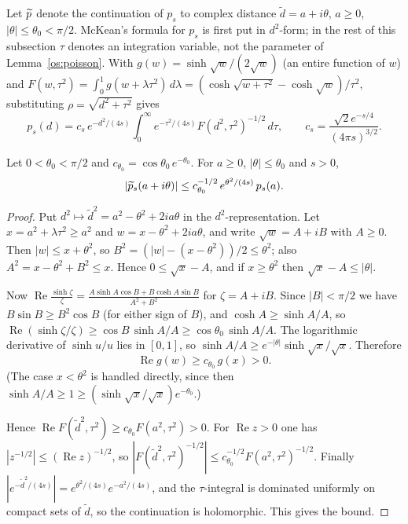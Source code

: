 Let $\widetilde p$ denote the continuation of $p_s$ to complex distance $\tilde d=a+i\theta$, $a\ge0$, $|\theta|\le\theta_0<\pi/2$.
McKean's formula for $p_s$ is first put in $d^2$-form; in the rest of this subsection $\tau$ denotes an integration variable, not the
parameter of Lemma~\ref{os:poisson}. With $g(w)=\sinh\sqrt w/(2\sqrt w)$ (an entire function of $w$) and
$F(w,\tau^2)=\int_0^1g(w+\lambda\tau^2)\,d\lambda=(\cosh\sqrt{w+\tau^2}-\cosh\sqrt w)/\tau^2$, substituting $\rho=\sqrt{d^2+\tau^2}$ gives
\[
p_s(d)=c_s\,e^{-d^2/(4s)}\int_0^\infty e^{-\tau^2/(4s)}F(d^2,\tau^2)^{-1/2}\,d\tau,\qquad c_s=\frac{\sqrt2e^{-s/4}}{(4\pi s)^{3/2}}.
\]

\begin{lemma}\label{os:hk}
Let $0<\theta_0<\pi/2$ and $c_{\theta_0}=\cos\theta_0\,e^{-\theta_0}$. For $a\ge0$, $|\theta|\le\theta_0$ and $s>0$,
\[
|\widetilde p_s(a+i\theta)|\le c_{\theta_0}^{-1/2}\,e^{\theta^2/(4s)}\,p_s(a).
\]
\end{lemma}
\begin{proof}
Put $d^2\mapsto\tilde d^2=a^2-\theta^2+2ia\theta$ in the $d^2$-representation. Let $x=a^2+\lambda\tau^2\ge a^2$ and $w=x-\theta^2+2ia\theta$,
and write $\sqrt w=A+iB$ with $A\ge0$. Then $|w|\le x+\theta^2$, so $B^2=(|w|-(x-\theta^2))/2\le\theta^2$; also $A^2=x-\theta^2+B^2\le x$.
Hence $0\le\sqrt x-A$, and if $x\ge\theta^2$ then $\sqrt x-A\le|\theta|$.

Now $\operatorname{Re}\frac{\sinh\zeta}{\zeta}=\frac{A\sinh A\cos B+B\cosh A\sin B}{A^2+B^2}$ for $\zeta=A+iB$. Since $|B|<\pi/2$ we have
$B\sin B\ge B^2\cos B$ (for either sign of $B$), and $\cosh A\ge\sinh A/A$, so $\operatorname{Re}(\sinh\zeta/\zeta)\ge\cos B\,\sinh A/A\ge\cos\theta_0\,\sinh A/A$. The
logarithmic derivative of $\sinh u/u$ lies in $[0,1]$, so $\sinh A/A\ge e^{-|\theta|}\sinh\sqrt x/\sqrt x$. Therefore
\[
\operatorname{Re}g(w)\ge c_{\theta_0}\,g(x)>0.
\]
(The case $x<\theta^2$ is handled directly, since then $\sinh A/A\ge1\ge(\sinh\sqrt x/\sqrt x)e^{-\theta_0}$.)

Hence $\operatorname{Re}F(\tilde d^2,\tau^2)\ge c_{\theta_0}F(a^2,\tau^2)>0$. For $\operatorname{Re}z>0$ one has $|z^{-1/2}|\le(\operatorname{Re}z)^{-1/2}$, so
$|F(\tilde d^2,\tau^2)^{-1/2}|\le c_{\theta_0}^{-1/2}F(a^2,\tau^2)^{-1/2}$. Finally
$|e^{-\tilde d^2/(4s)}|=e^{\theta^2/(4s)}e^{-a^2/(4s)}$, and the $\tau$-integral is dominated uniformly on compact sets of $\tilde d$, so the continuation is
holomorphic. This gives the bound.
\end{proof}
